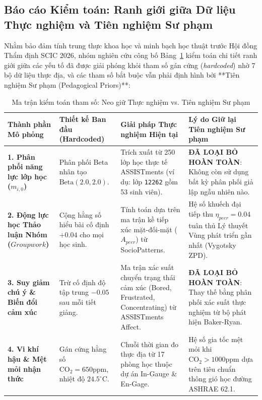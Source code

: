 \subsection{Báo cáo Kiểm toán: Ranh giới giữa Dữ liệu Thực nghiệm và Tiên nghiệm Sư phạm}\label{subsec:hardcode-audit}
Nhằm bảo đảm tính trung thực khoa học và minh bạch học thuật trước Hội đồng Thẩm định SCIC 2026, nhóm nghiên cứu công bố Bảng~\ref{tab:hardcode-audit-matrix} kiểm toán chi tiết ranh giới giữa các yếu tố đã được giải phóng khỏi tham số gán cứng (\textit{hardcoded}) nhờ 7 bộ dữ liệu thực địa, và các tham số bắt buộc vẫn phải định hình bởi **Tiên nghiệm Sư phạm (Pedagogical Priors)**:

\begin{table}[htbp]
  \centering\small
  \caption{Ma trận kiểm toán tham số: Neo giữ Thực nghiệm vs. Tiên nghiệm Sư phạm}\label{tab:hardcode-audit-matrix}
  \begin{tabularx}{\textwidth}{p{3.2cm} p{3.2cm} p{3.8cm} X}
    \toprule
    \textbf{Thành phần Mô phỏng} & \textbf{Thiết kế Ban đầu (Hardcoded)} & \textbf{Giải pháp Thực nghiệm Hiện tại} & \textbf{Lý do Giữ lại Tiên nghiệm Sư phạm} \\
    \midrule
    \textbf{1. Phân phối năng lực lớp học ($m_{i, 0}$)} & Phân phối Beta nhân tạo $\text{Beta}(2.0, 2.0)$. & Trích xuất từ 250 lớp học thực tế ASSISTments (ví dụ: lớp \texttt{12262} gồm 53 sinh viên). & \textbf{ĐÃ LOẠI BỎ HOÀN TOÀN}: Không còn sử dụng bất kỳ phân phối giả lập ngẫu nhiên nào. \\
    \addlinespace
    \textbf{2. Động lực học Thảo luận Nhóm ($Groupwork$)} & Cộng hằng số hiểu bài cố định $+0.04$ cho mọi học sinh. & Tính toán dựa trên ma trận kề tiếp xúc mặt-đối-mặt ($A_{peer}$) từ SocioPatterns. & Hệ số khuếch đại tiếp thu $\eta_{peer} = 0.04$ tuân thủ Lý thuyết Vùng phát triển gần nhất (Vygotsky ZPD). \\
    \addlinespace
    \textbf{3. Suy giảm chú ý \& Biến đổi cảm xúc} & Trừ cố định độ tập trung $-0.05$ sau mỗi tiết giảng. & Ma trận xác suất chuyển trạng thái cảm xúc (Bored, Frustrated, Concentrating) từ ASSISTments Affect. & \textbf{ĐÃ LOẠI BỎ HOÀN TOÀN}: Thay thế bằng phân phối xác suất thực nghiệm từ bộ phát hiện Baker-Ryan. \\
    \addlinespace
    \textbf{4. Vi khí hậu \& Mệt mỏi nhận thức} & Gán cứng hằng số $\text{CO}_2 = 650\text{ppm}$, nhiệt độ $24.5^\circ\text{C}$. & Chuỗi thời gian đo thực địa từ 17 phòng học thuộc dự án In-Gauge \& En-Gage. & Hệ số gia tốc mệt mỏi khi $\text{CO}_2 > 1000\text{ppm}$ dựa trên tiêu chuẩn thông gió học đường ASHRAE 62.1. \\

\end{tabularx}
\end{table}
